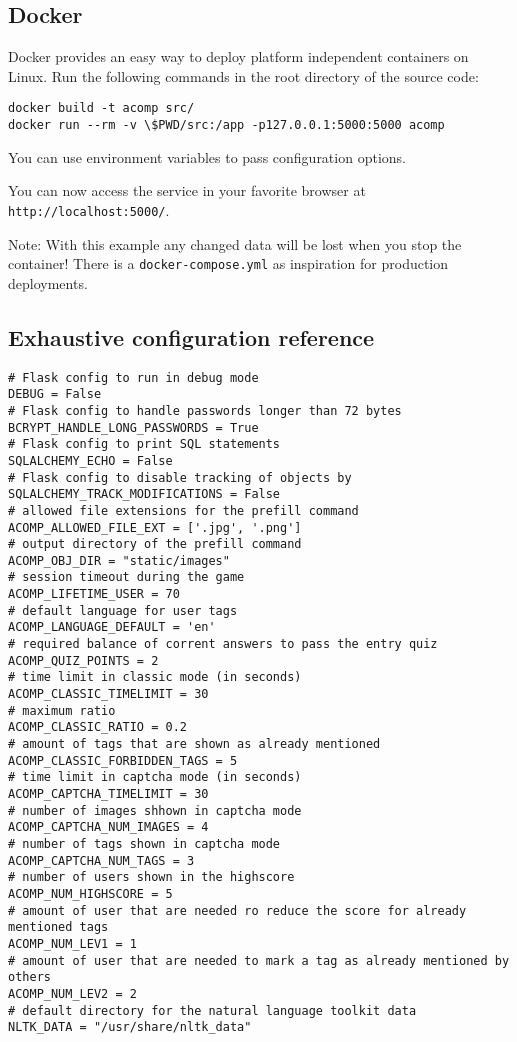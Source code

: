 \subsection{Docker}
\label{gacomphs19:sec:usage:docker}
Docker provides an easy way to deploy platform independent containers on Linux.
Run the following commands in the root directory of the source code:

\begin{verbatim}
docker build -t acomp src/
docker run --rm -v \$PWD/src:/app -p127.0.0.1:5000:5000 acomp
\end{verbatim}

You can use environment variables to pass configuration options.

You can now access the service in your favorite browser at
\texttt{http://localhost:5000/}.

Note: With this example any changed data will be lost when you stop the
container! There is a \texttt{docker-compose.yml} as inspiration for production deployments.

\subsection{Exhaustive configuration reference}
\begin{verbatim}
# Flask config to run in debug mode
DEBUG = False
# Flask config to handle passwords longer than 72 bytes
BCRYPT_HANDLE_LONG_PASSWORDS = True
# Flask config to print SQL statements
SQLALCHEMY_ECHO = False
# Flask config to disable tracking of objects by
SQLALCHEMY_TRACK_MODIFICATIONS = False
# allowed file extensions for the prefill command
ACOMP_ALLOWED_FILE_EXT = ['.jpg', '.png']
# output directory of the prefill command
ACOMP_OBJ_DIR = "static/images"
# session timeout during the game
ACOMP_LIFETIME_USER = 70
# default language for user tags
ACOMP_LANGUAGE_DEFAULT = 'en'
# required balance of corrent answers to pass the entry quiz
ACOMP_QUIZ_POINTS = 2
# time limit in classic mode (in seconds)
ACOMP_CLASSIC_TIMELIMIT = 30
# maximum ratio
ACOMP_CLASSIC_RATIO = 0.2
# amount of tags that are shown as already mentioned
ACOMP_CLASSIC_FORBIDDEN_TAGS = 5
# time limit in captcha mode (in seconds)
ACOMP_CAPTCHA_TIMELIMIT = 30
# number of images shhown in captcha mode
ACOMP_CAPTCHA_NUM_IMAGES = 4
# number of tags shown in captcha mode
ACOMP_CAPTCHA_NUM_TAGS = 3
# number of users shown in the highscore
ACOMP_NUM_HIGHSCORE = 5
# amount of user that are needed ro reduce the score for already mentioned tags
ACOMP_NUM_LEV1 = 1
# amount of user that are needed to mark a tag as already mentioned by others
ACOMP_NUM_LEV2 = 2
# default directory for the natural language toolkit data
NLTK_DATA = "/usr/share/nltk_data"
\end{verbatim}
